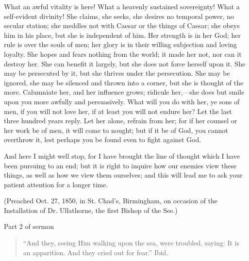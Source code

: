 What an awful vitality is here! What a heavenly
sustained sovereignty! What a self-evident divinity! She
claims, she seeks, she desires no temporal power, no
secular station; she meddles not with Caesar or the
things of Caesar; she obeys him in his place, but she is
independent of him. Her strength is in her God; her rule
is over the souls of men; her glory is in their willing
subjection and loving loyalty. She hopes and fears
nothing from the world; it made her not, nor can it
destroy her. She can benefit it largely, but she does not
force herself upon it. She may be persecuted by it, but
she thrives under the persecution. She may be ignored,
she may be silenced and thrown into a corner, but she is
thought of the more. Calumniate her, and her influence
grows; ridicule her,—she does but smile upon you
more awfully and persuasively. What will you do with her,
ye sons of men, if you will not love her, if at least you
will not endure her? Let the last three hundred years
reply. Let her alone, refrain from her; for if her
counsel or her work be of men, it will come to nought;
but if it be of God, you cannot overthrow it, lest
perhaps you be found even to fight against God.

And here I might well stop, for I have brought the
line of thought which I have been pursuing to an end; but
it is right to inquire how our enemies view these things,
as well as how we view them ourselves; and this will lead
me to ask your patient attention for a longer time.

(Preached Oct. 27, 1850, in St. Chad's, Birmingham, on
occasion of the Installation of Dr. Ullathorne, the first
Bishop of the See.)

Part 2 of sermon


\begin{quote}

``And they, seeing Him walking upon the sea,
were troubled, saying: It is an apparition. And they
cried out for fear.'' Ibid.

\end{quote}

